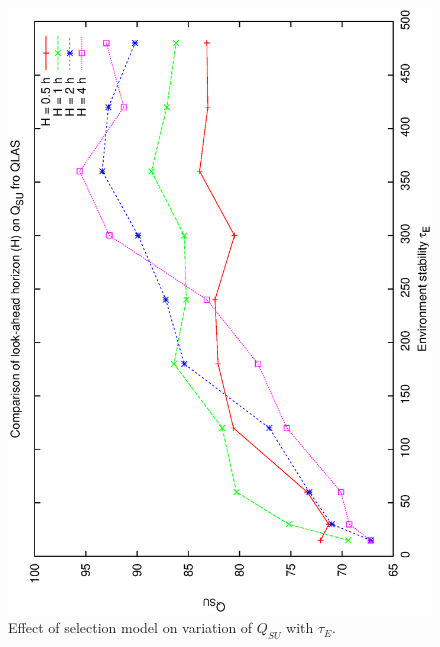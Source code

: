 \begin{figure}[h]
 \label{fig:qsu_hte}
\begin{center}
 \includegraphics[scale=0.5, angle=-90]{figures/qsu_hte.eps}
 \caption[Effect of selection model on variation of $Q_{SU}$ with $\tau_E$.] 
   {Effect of selection model on variation of $Q_{SU}$ with $\tau_E$.}
\end{center}
\end{figure}
